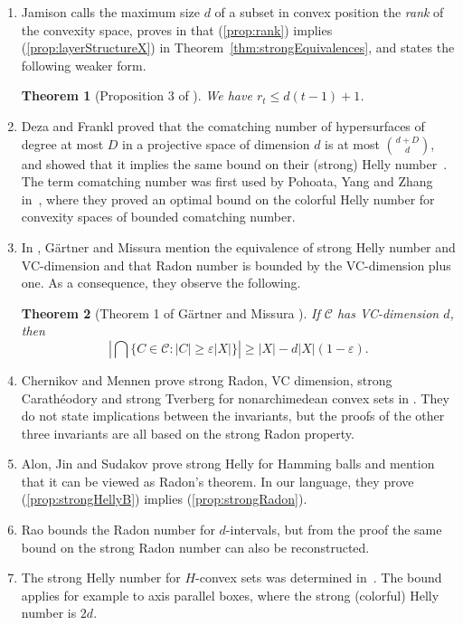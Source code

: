 \documentclass[11pt]{article}
\newtheorem{thm}{Theorem}[section]%
\theoremstyle{definition}
\newcommand{\C}{\mathcal{C}}
\begin{document}
\begin{enumerate}


\item Jamison calls the maximum size $d$ of a subset in convex position the \emph{rank} of the convexity space, proves in \cite{jamison1981partition} that (\ref{prop:rank}) implies (\ref{prop:layerStructureX}) in Theorem~\ref{thm:strongEquivalences}, and states the following weaker form.

\begin{thm}[Proposition 3 of \cite{jamison1981partition}]
    We have $r_t \leq d(t-1) + 1$.
\end{thm}

\item Deza and Frankl proved that the comatching number of hypersurfaces of degree at most $D$ in a projective space of dimension $d$ is at most $\binom{d+D}{d}$, and showed that it implies the same bound on their (strong) Helly number~\cite{deza1987helly}. The term comatching number was first used by Pohoata, Yang and Zhang in~\cite{pohoata2025colorful}, where they proved an optimal bound on the colorful Helly number for convexity spaces of bounded comatching number.

\item In \cite{gartner2014online}, G\"artner and Missura mention the equivalence of strong Helly number and VC-dimension and that Radon number is bounded by the VC-dimension plus one.
As a consequence, they observe the following.

\begin{thm}[Theorem 1 of G\"artner and Missura \cite{gartner2014online}]
    If $\C$ has VC-dimension $d$, then
    \[
    \left|\bigcap\{C \in \C: |C| \geq \varepsilon |X| \}\right| \geq |X| - d|X|(1-\varepsilon).
    \]
\end{thm}

\item Chernikov and Mennen prove strong Radon, VC dimension, strong Carath\'eodory and strong Tverberg for nonarchimedean convex sets in \cite{chernikov2023combinatorial}. They do not state implications between the invariants, but the proofs of the other three invariants are all based on the strong Radon property.

\item Alon, Jin and Sudakov \cite{alon2024helly} prove strong Helly for Hamming balls and mention that it can be viewed as Radon's theorem.
In our language, they prove (\ref{prop:strongHellyB}) implies (\ref{prop:strongRadon}).

\item Rao \cite{rao2025helly} bounds the Radon number for $d$-intervals, but from the proof the same bound on the strong Radon number can also be reconstructed.

\item The strong Helly number for $H$-convex sets was determined in~\cite{frankl2025helly}. The bound applies for example to axis parallel boxes, where the strong (colorful) Helly number is $2d$.
\end{enumerate}
\end{document}
